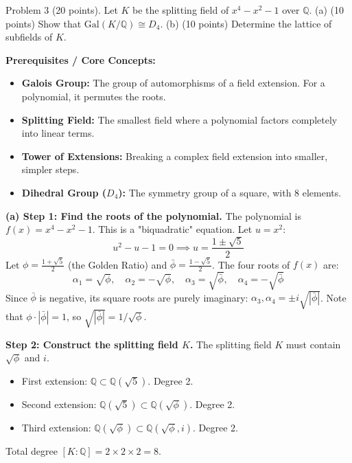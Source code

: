 \begin{exercise}
\label{algebra:2016:8}
Problem 3 (20 points). Let $K$ be the splitting field of $x^4 - x^2 - 1$ over $\mathbb{Q}$.
(a) (10 points) Show that $\mathrm{Gal}(K/\mathbb{Q}) \cong D_4$.
(b) (10 points) Determine the lattice of subfields of $K$.
\end{exercise}
\begin{solution}
\textbf{Prerequisites / Core Concepts:}
\begin{itemize}
    \item \textbf{Galois Group:} The group of automorphisms of a field extension. For a polynomial, it permutes the roots.
    \item \textbf{Splitting Field:} The smallest field where a polynomial factors completely into linear terms.
    \item \textbf{Tower of Extensions:} Breaking a complex field extension into smaller, simpler steps.
    \item \textbf{Dihedral Group ($D_4$):} The symmetry group of a square, with 8 elements.
\end{itemize}

\textbf{(a) Step 1: Find the roots of the polynomial.}
The polynomial is $f(x) = x^4 - x^2 - 1$. This is a "biquadratic" equation. Let $u = x^2$:
\[ u^2 - u - 1 = 0 \implies u = \frac{1 \pm \sqrt{5}}{2} \]
Let $\phi = \frac{1 + \sqrt{5}}{2}$ (the Golden Ratio) and $\bar{\phi} = \frac{1 - \sqrt{5}}{2}$.
The four roots of $f(x)$ are:
\[ \alpha_1 = \sqrt{\phi}, \quad \alpha_2 = -\sqrt{\phi}, \quad \alpha_3 = \sqrt{\bar{\phi}}, \quad \alpha_4 = -\sqrt{\bar{\phi}} \]
Since $\bar{\phi}$ is negative, its square roots are purely imaginary: $\alpha_3, \alpha_4 = \pm i \sqrt{|\bar{\phi}|}$.
Note that $\phi \cdot |\bar{\phi}| = 1$, so $\sqrt{|\bar{\phi}|} = 1/\sqrt{\phi}$.

\textbf{Step 2: Construct the splitting field $K$.}
The splitting field $K$ must contain $\sqrt{\phi}$ and $i$.
\begin{itemize}
    \item First extension: $\mathbb{Q} \subset \mathbb{Q}(\sqrt{5})$. Degree 2.
    \item Second extension: $\mathbb{Q}(\sqrt{5}) \subset \mathbb{Q}(\sqrt{\phi})$. Degree 2.
    \item Third extension: $\mathbb{Q}(\sqrt{\phi}) \subset \mathbb{Q}(\sqrt{\phi}, i)$. Degree 2.
\end{itemize}
Total degree $[K:\mathbb{Q}] = 2 \times 2 \times 2 = 8$.


\end{solution}

